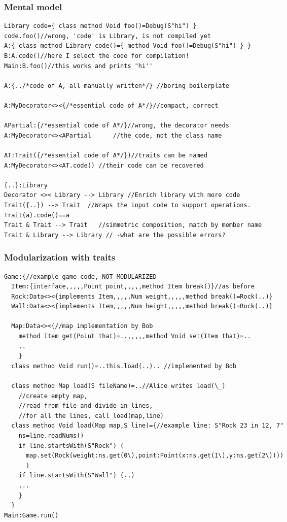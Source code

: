 \begin{frame}[fragile]
\frametitle{Mental model}
\begin{NiceCode}{59ex}{0.8}
\begin{lstlisting}
Library code={ class method Void foo()=Debug(S"hi") }
code.foo()//wrong, 'code' is Library, is not compiled yet
A:{ class method Library code()={ method Void foo()=Debug(S"hi") } } 
B:A.code()//here I select the code for compilation!
Main:B.foo()//this works and prints "hi''

A:{../*code of A, all manually written*/} //boring boilerplate

A:MyDecorator<><{/*essential code of A*/}//compact, correct

APartial:{/*essential code of A*/}//wrong, the decorator needs
A:MyDecorator<><APartial      //the code, not the class name

AT:Trait({/*essential code of A*/})//traits can be named
A:MyDecorator<><AT.code() //their code can be recovered
 
{..}:Library
Decorator <>< Library --> Library //Enrich library with more code
Trait({..}) --> Trait  //Wraps the input code to support operations.
Trait(a).code()==a
Trait & Trait --> Trait   //simmetric composition, match by member name
Trait & Library --> Library // -what are the possible errors?
\end{lstlisting}
\end{NiceCode}
\end{frame}



\begin{frame}[fragile]
\frametitle{Modularization with traits}
\begin{NiceCode}{59ex}{0.7}
\begin{lstlisting}
Game:{//example game code, NOT MODULARIZED
  Item:{interface,,,,,Point point,,,,,method Item break()}//as before
  Rock:Data<><{implements Item,,,,,Num weight,,,,,method break()=Rock(..)}
  Wall:Data<><{implements Item,,,,,Num height,,,,,method break()=Rock(..)}
  
  Map:Data<><{//map implementation by Bob
    method Item get(Point that)=..,,,,,method Void set(Item that)=..
    ..
    }
  class method Void run()=..this.load(..).. //implemented by Bob
  
  class method Map load(S fileName)=..//Alice writes load(\_)
    //create empty map,
    //read from file and divide in lines,
    //for all the lines, call load(map,line)
  class method Void load(Map map,S line)={//example line: S"Rock 23 in 12, 7"
    ns=line.readNums()
    if line.startsWith(S"Rock") (
      map.set(Rock(weight:ns.get(0\),point:Point(x:ns.get(1\),y:ns.get(2\))))
      )
    if line.startsWith(S"Wall") (..)
    ...
    }
  }
Main:Game.run()
\end{lstlisting}
\end{NiceCode}
\end{frame}



